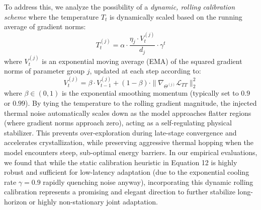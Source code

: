 To address this, we analyze the possibility of a \emph{dynamic, rolling calibration scheme} where the temperature $T_t$ is dynamically scaled based on the running average of gradient norms:
\begin{equation}
    T_t^{(j)} = \alpha \cdot \frac{\eta_j \cdot V_t^{(j)}}{d_j} \cdot \gamma^t
\end{equation}
where $V_t^{(j)}$ is an exponential moving average (EMA) of the squared gradient norms of parameter group $j$, updated at each step according to:
\begin{equation}
    V_t^{(j)} = \beta \cdot V_{t-1}^{(j)} + (1 - \beta) \cdot \|\nabla_{\Theta^{(j)}} \mathcal{L}_{TT}\|_2^2
\end{equation}
where $\beta \in (0, 1)$ is the exponential smoothing momentum (typically set to $0.9$ or $0.99$).
By tying the temperature to the rolling gradient magnitude, the injected thermal noise automatically scales down as the model approaches flatter regions (where gradient norms approach zero), acting as a self-regulating physical stabilizer.
This prevents over-exploration during late-stage convergence and accelerates crystallization, while preserving aggressive thermal hopping when the model encounters steep, sub-optimal energy barriers.
In our empirical evaluations, we found that while the static calibration heuristic in Equation 12 is highly robust and sufficient for low-latency adaptation (due to the exponential cooling rate $\gamma = 0.9$ rapidly quenching noise anyway), incorporating this dynamic rolling calibration represents a promising and elegant direction to further stabilize long-horizon or highly non-stationary joint adaptation.

